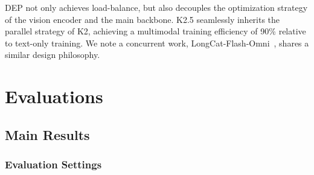 \documentclass{article}
\newcommand{\citep}[1]{\parencite{#1}}
\begin{document}
DEP not only achieves load-balance, but also decouples the optimization strategy of the vision encoder and the main backbone. K2.5 seamlessly inherits the parallel strategy of K2, achieving a multimodal training efficiency of 90\% relative to text-only training. We note a concurrent work, LongCat-Flash-Omni~\citep{team2025longcat}, shares a similar design philosophy.

\section{Evaluations}
\subsection{Main Results}
\subsubsection{Evaluation Settings}
\end{document}
